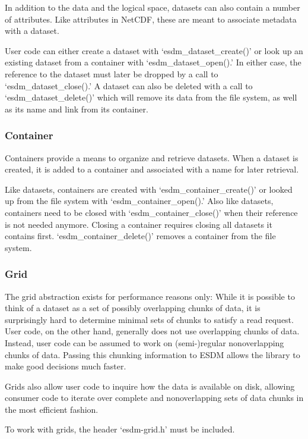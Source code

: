 In addition to the data and the logical space, datasets can also contain
a number of attributes. Like attributes in NetCDF, these are meant to
associate metadata with a dataset.

User code can either create a dataset with `esdm\_dataset\_create()' or
look up an existing dataset from a container with
`esdm\_dataset\_open().' In either case, the reference to the dataset
must later be dropped by a call to `esdm\_dataset\_close().' A dataset
can also be deleted with a call to `esdm\_dataset\_delete()' which will
remove its data from the file system, as well as its name and link from
its container.

\subsubsection{Container}%

Containers provide a means to organize and retrieve datasets. When a
dataset is created, it is added to a container and associated with a
name for later retrieval.

Like datasets, containers are created with `esdm\_container\_create()'
or looked up from the file system with `esdm\_container\_open().' Also
like datasets, containers need to be closed with
`esdm\_container\_close()' when their reference is not needed anymore.
Closing a container requires closing all datasets it contains first.
`esdm\_container\_delete()' removes a container from the file system.

\subsubsection{Grid}%

The grid abstraction exists for performance reasons only: While it is
possible to think of a dataset as a set of possibly overlapping chunks
of data, it is surprisingly hard to determine minimal sets of chunks to
satisfy a read request. User code, on the other hand, generally does not
use overlapping chunks of data. Instead, user code can be assumed to
work on (semi-)regular nonoverlapping chunks of data. Passing this
chunking information to ESDM allows the library to make good decisions
much faster.

Grids also allow user code to inquire how the data is available on disk,
allowing consumer code to iterate over complete and nonoverlapping sets
of data chunks in the most efficient fashion.

To work with grids, the header `esdm-grid.h' must be included.

